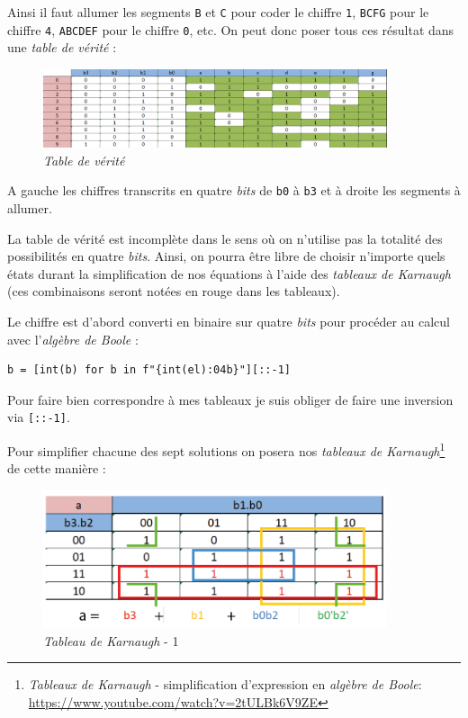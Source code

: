 Ainsi il faut allumer les segments \texttt{B} et \texttt{C} pour coder le chiffre \texttt{1}, \texttt{BCFG} pour le chiffre \texttt{4}, \texttt{ABCDEF} pour le chiffre \texttt{0}, etc. On peut donc poser tous ces résultat dans une \textit{table de vérité} :
\begin{figure}[h]
    \centering
    \includegraphics[width=0.9\textwidth]{IMG/table_de_verite.png}
    \caption{\textit{Table de vérité}}
    \label{fig:colorpicker}
\end{figure}
\medskip

A gauche les chiffres transcrits en quatre \textit{bits} de \texttt{b0} à \texttt{b3} et à droite les segments à allumer.
\medskip

La table de vérité est incomplète dans le sens où on n'utilise pas la totalité des possibilités en quatre \textit{bits}. Ainsi, on pourra être libre de choisir n'importe quels états durant la simplification de nos équations à l'aide des \textit{tableaux de Karnaugh} (ces combinaisons seront notées en rouge dans les tableaux).
\medskip

Le chiffre est d'abord converti en binaire sur quatre \textit{bits} pour procéder au calcul avec l'\textit{algèbre de Boole }:
\begin{verbatim}
b = [int(b) for b in f"{int(el):04b}"][::-1]
\end{verbatim}
\medskip

Pour faire bien correspondre à mes tableaux je suis obliger de faire une inversion via \texttt{[::-1]}.
\newpage

Pour simplifier chacune des sept solutions on posera nos \textit{tableaux de Karnaugh}\footnote{\textit{Tableaux de Karnaugh} - simplification d'expression en \textit{algèbre de Boole}: \url{https://www.youtube.com/watch?v=2tULBk6V9ZE}} de cette manière :
\begin{figure}[h!]
    \centering
    \includegraphics[width=0.9\textwidth]{IMG/tab_de_K_1.png}
    \caption{\textit{Tableau de Karnaugh} - 1}
    \label{fig:colorpicker}
\end{figure}
\medskip

